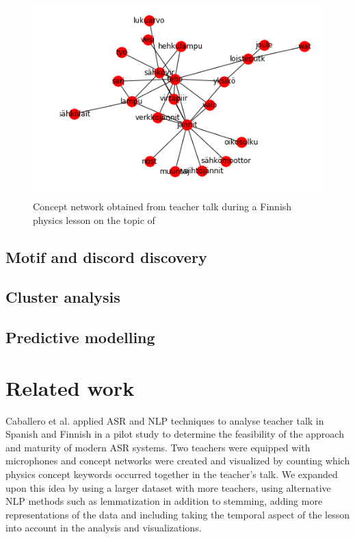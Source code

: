 \documentclass[utf8,english]{gradu3}
\begin{document}
\begin{figure}
  \includegraphics[width=\linewidth]{../figures/graph1.png}
  \caption{Concept network obtained from teacher talk during a Finnish physics lesson on the topic of }
  \label{fig:graph1}
\end{figure}

\section{Motif and discord discovery}


\section{Cluster analysis}

\section{Predictive modelling}

\chapter{Related work}

Caballero et al. \parencite*{caballeroASRClassroomToday2017} applied ASR and NLP techniques to analyse teacher talk in Spanish and Finnish in a pilot study to determine the feasibility of the approach and maturity of modern ASR systems. Two teachers were equipped with microphones and concept networks were created and visualized by counting which physics concept keywords occurred together in the teacher's talk. We expanded upon this idea by using a larger dataset with more teachers, using alternative NLP methods such as lemmatization in addition to stemming, adding more representations of the data and including taking the temporal aspect of the lesson into account in the analysis and visualizations.
\end{document}
